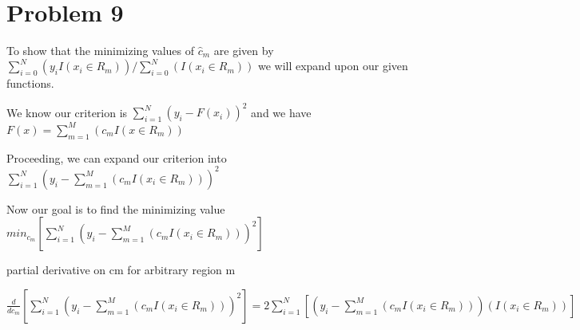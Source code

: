 \documentclass[11pt]{article}
\begin{document}
\begin{center}

\ \\
\end{center}


\section*{Problem 9}

\vspace{5 mm}
\noindent
To show that the minimizing values of $\hat{c}_{m}$ are given by $\sum\limits_{i=0}^N (y_{i} I(x_{i} \in R_{m})) / \sum\limits_{i=0}^N (I(x_{i} \in R_{m}))$ we will expand upon our given functions.

\vspace{3 mm}
\noindent
We know our criterion is $\sum\limits_{i=1}^N (y_{i} - F(x_{i}))^2$ and we have $F(x) = \sum\limits_{m=1}^M (c_{m}I(x \in R_{m}))$

\vspace{3 mm}
\noindent
Proceeding, we can expand our criterion into $\sum\limits_{i=1}^N (y_{i} - \sum\limits_{m=1}^M (c_{m}I(x_{i} \in R_{m})))^2$

\vspace{3 mm}
\noindent
Now our goal is to find the minimizing value $min_{c_{m}}[\sum\limits_{i=1}^N (y_{i} - \sum\limits_{m=1}^M (c_{m}I(x_{i} \in R_{m})))^2]$ 

\vspace{3 mm}
\noindent
partial derivative on cm for arbitrary region m

\vspace{3 mm}
\noindent
$\frac{d}{dc_{m}}[\sum\limits_{i=1}^N (y_{i} - \sum\limits_{m=1}^M (c_{m}I(x_{i} \in R_{m})))^2] = 2\sum\limits_{i=1}^N [(y_{i} - \sum\limits_{m=1}^M (c_{m}I(x_{i} \in R_{m})))(I(x_{i} \in R_{m}))]$ 
\end{document}
